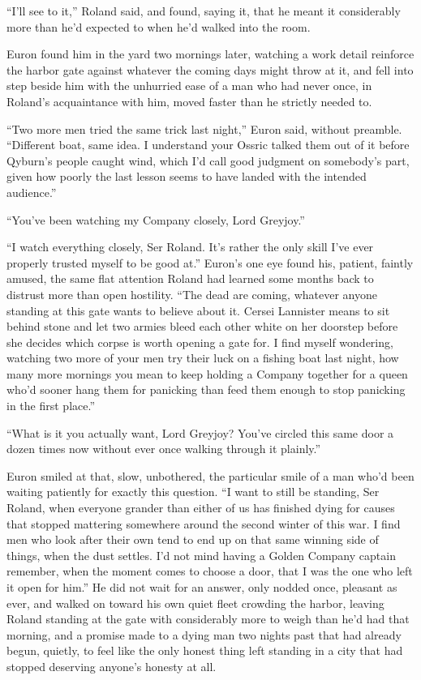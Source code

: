 “I’ll see to it,” Roland said, and found, saying it, that he meant it considerably more than he’d expected to when he’d walked into the room.

\sceneBreak

Euron found him in the yard two mornings later, watching a work detail reinforce the harbor gate against whatever the coming days might throw at it, and fell into step beside him with the unhurried ease of a man who had never once, in Roland’s acquaintance with him, moved faster than he strictly needed to.

“Two more men tried the same trick last night,” Euron said, without preamble. “Different boat, same idea. I understand your Ossric talked them out of it before Qyburn’s people caught wind, which I’d call good judgment on somebody’s part, given how poorly the last lesson seems to have landed with the intended audience.”

“You’ve been watching my Company closely, Lord Greyjoy.”

“I watch everything closely, Ser Roland. It’s rather the only skill I’ve ever properly trusted myself to be good at.” Euron’s one eye found his, patient, faintly amused, the same flat attention Roland had learned some months back to distrust more than open hostility. “The dead are coming, whatever anyone standing at this gate wants to believe about it. Cersei Lannister means to sit behind stone and let two armies bleed each other white on her doorstep before she decides which corpse is worth opening a gate for. I find myself wondering, watching two more of your men try their luck on a fishing boat last night, how many more mornings you mean to keep holding a Company together for a queen who’d sooner hang them for panicking than feed them enough to stop panicking in the first place.”

“What is it you actually want, Lord Greyjoy? You’ve circled this same door a dozen times now without ever once walking through it plainly.”

Euron smiled at that, slow, unbothered, the particular smile of a man who’d been waiting patiently for exactly this question. “I want to still be standing, Ser Roland, when everyone grander than either of us has finished dying for causes that stopped mattering somewhere around the second winter of this war. I find men who look after their own tend to end up on that same winning side of things, when the dust settles. I’d not mind having a Golden Company captain remember, when the moment comes to choose a door, that I was the one who left it open for him.” He did not wait for an answer, only nodded once, pleasant as ever, and walked on toward his own quiet fleet crowding the harbor, leaving Roland standing at the gate with considerably more to weigh than he’d had that morning, and a promise made to a dying man two nights past that had already begun, quietly, to feel like the only honest thing left standing in a city that had stopped deserving anyone’s honesty at all.

